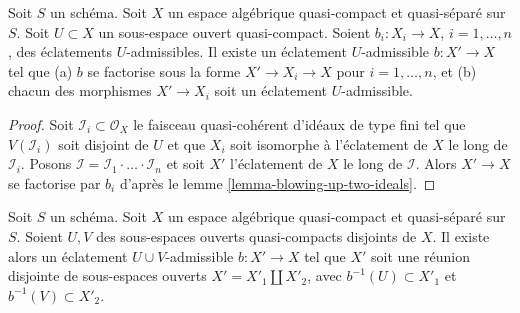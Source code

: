\begin{lemma}
\label{lemma-dominate-admissible-blowups}
Soit $S$ un schéma.
Soit $X$ un espace algébrique quasi-compact et quasi-séparé sur $S$.
Soit $U \subset X$ un sous-espace ouvert quasi-compact.
Soient $b_i : X_i \to X$, $i = 1, \ldots, n$, des éclatements $U$-admissibles.
Il existe un éclatement $U$-admissible $b : X' \to X$ tel que
(a) $b$ se factorise sous la forme $X' \to X_i \to X$ pour $i = 1, \ldots, n$, et
(b) chacun des morphismes $X' \to X_i$ soit un éclatement $U$-admissible.
\end{lemma}

\begin{proof}
Soit $\mathcal{I}_i \subset \mathcal{O}_X$ le faisceau quasi-cohérent d'idéaux
de type fini tel que $V(\mathcal{I}_i)$ soit
disjoint de $U$ et que $X_i$ soit isomorphe à
l'éclatement de $X$ le long de $\mathcal{I}_i$. Posons
$\mathcal{I} = \mathcal{I}_1 \cdot \ldots \cdot \mathcal{I}_n$
et soit $X'$ l'éclatement de $X$ le long de $\mathcal{I}$. Alors
$X' \to X$ se factorise par $b_i$ d'après le lemme \ref{lemma-blowing-up-two-ideals}.
\end{proof}

\begin{lemma}
\label{lemma-separate-disjoint-opens-by-blowing-up}
Soit $S$ un schéma.
Soit $X$ un espace algébrique quasi-compact et quasi-séparé sur $S$.
Soient $U, V$ des sous-espaces ouverts quasi-compacts disjoints de $X$.
Il existe alors un éclatement $U \cup V$-admissible $b : X' \to X$
tel que $X'$ soit une réunion disjointe de sous-espaces ouverts
$X' = X'_1 \amalg X'_2$, avec $b^{-1}(U) \subset X'_1$ et
$b^{-1}(V) \subset X'_2$.
\end{lemma}


